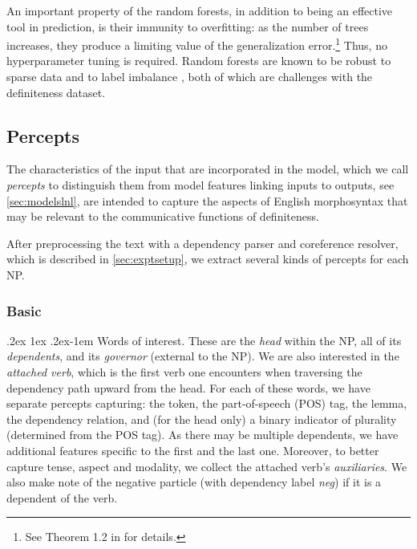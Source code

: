 \documentclass[11pt,letterpaper]{article}
\makeatletter
\renewcommand{\paragraph}{%
  \@startsection{paragraph}{4}%
  {\z@}{.2ex \@plus 1ex \@minus .2ex}{-1em}%
  {\normalfont\normalsize\bfseries}%
}
\makeatother
\begin{document}
An important property of the random forests, in addition to being an effective tool in prediction, is their immunity to overfitting: 
as the number of trees increases, they produce a limiting value of the generalization error.\footnote{See Theorem 1.2 in \cite{Breiman:2001} for details.} 
Thus, no hyperparameter tuning is required. %
Random forests are known to be robust to sparse data and to label imbalance \citep{chen}, both of which are challenges with the definiteness dataset.

\subsection{Percepts}\label{sec:feats}

The characteristics of the input that are incorporated in the model, which we call \emph{percepts} 
to distinguish them from model features linking inputs to outputs, see \cref{sec:modelslnl}, 
are intended to capture the aspects of English morphosyntax that may be relevant 
to the communicative functions of definiteness.

After preprocessing the text with a dependency parser and coreference resolver, which is described in \cref{sec:exptsetup}, 
we extract several kinds of percepts for each NP.

\subsubsection{Basic}

\paragraph{Words of interest.} 
These are the \emph{head} within the NP, all of its \emph{dependents}, and its \emph{governor} (external to the NP). 
We are also interested in the \emph{attached verb}, which is the first verb one encounters when traversing the dependency path upward from the head. 
For each of these words, we have separate percepts capturing: the token, the part-of-speech (POS) tag, the lemma, 
the dependency relation,
and (for the head only) a binary indicator of plurality (determined from the POS tag).
As there may be multiple dependents, we have additional features specific to the first and the last one. 
Moreover, to better capture tense, aspect and modality, we collect the attached verb's \emph{auxiliaries}. 
We also make note of the negative particle (with dependency label \emph{neg}) if it is a dependent of the verb.
    
\end{document}
